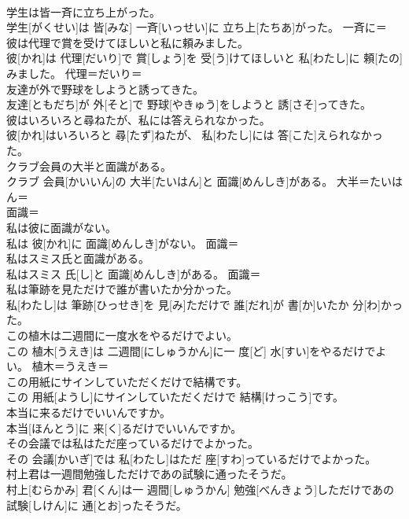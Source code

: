 \documentclass[8pt]{extreport}
\begin{document}
\begin{CJK}{UTF8}{min}
\\	学生は皆一斉に立ち上がった。	
\\	学生[がくせい]は 皆[みな] 一斉[いっせい]に 立ち上[たちあ]がった。	一斉に＝ 
\\	彼は代理で賞を受けてほしいと私に頼みました。	
\\	彼[かれ]は 代理[だいり]で 賞[しょう]を 受[う]けてほしいと 私[わたし]に 頼[たの]みました。	代理＝だいり＝ 
\\	友達が外で野球をしようと誘ってきた。	
\\	友達[ともだち]が 外[そと]で 野球[やきゅう]をしようと 誘[さそ]ってきた。	
\\	彼はいろいろと尋ねたが、私には答えられなかった。	
\\	彼[かれ]はいろいろと 尋[たず]ねたが、 私[わたし]には 答[こた]えられなかった。	
\\	クラブ会員の大半と面識がある。	
\\	クラブ 会員[かいいん]の 大半[たいはん]と 面識[めんしき]がある。	大半＝たいはん＝ 
\\	面識＝ 
\\	私は彼に面識がない。	
\\	私は 彼[かれ]に 面識[めんしき]がない。	面識＝ 
\\	私はスミス氏と面識がある。	
\\	私はスミス 氏[し]と 面識[めんしき]がある。	面識＝ 
\\	私は筆跡を見ただけで誰が書いたか分かった。	
\\	私[わたし]は 筆跡[ひっせき]を 見[み]ただけで 誰[だれ]が 書[か]いたか 分[わ]かった。	
\\	この植木は二週間に一度水をやるだけでよい。	
\\	この 植木[うえき]は 二週間[にしゅうかん]に一 度[ど] 水[すい]をやるだけでよい。	植木＝うえき＝ 
\\	この用紙にサインしていただくだけで結構です。	
\\	この 用紙[ようし]にサインしていただくだけで 結構[けっこう]です。	
\\	本当に来るだけでいいんですか。	
\\	本当[ほんとう]に 来[く]るだけでいいんですか。	
\\	その会議では私はただ座っているだけでよかった。	
\\	その 会議[かいぎ]では 私[わたし]はただ 座[すわ]っているだけでよかった。	
\\	村上君は一週間勉強しただけであの試験に通ったそうだ。	
\\	村上[むらかみ] 君[くん]は一 週間[しゅうかん] 勉強[べんきょう]しただけであの 試験[しけん]に 通[とお]ったそうだ。	

\end{CJK}
\end{document}
